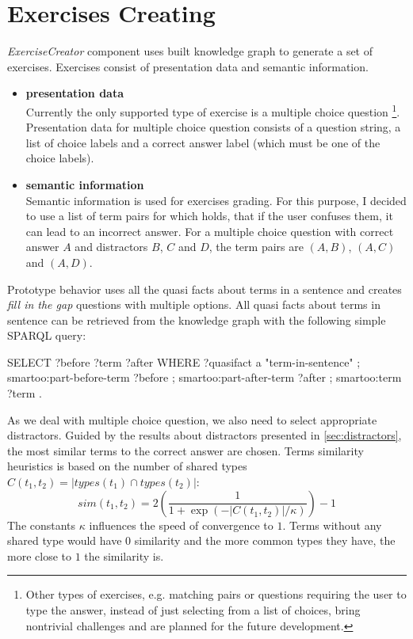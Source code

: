 \documentclass[12pt, twoside]{fithesis2}
\renewcommand{\_}{\leavevmode \kern0.07em\vbox{\hrule width0.4em}}
\newcommand{\squarebullet}{\textcolor{black}{\raisebox{0.15em}{\rule{4pt}{4pt}}}}
\newcommand{\emptysquarebullet}{\textcolor{black}{\raisebox{0.10em}{\tiny$\square$}}}
\newenvironment{myItemize}{
  \begin{itemize}[leftmargin=2em,rightmargin=1em,itemsep=\parskip ,parsep=0em,topsep=0em,partopsep=0em]
  \renewcommand{\labelitemi}{\squarebullet}
  \renewcommand{\labelitemii}{\textbullet}
}{
  \end{itemize}
}
\newcounter{choice}
\begin{document}
\section{Exercises Creating}
\label{sec:smartoo-exercises}

\textit{ExerciseCreator} component uses built knowledge graph to generate a set of exercises.
Exercises consist of presentation data and semantic information.
\begin{myItemize}
  \item \textbf{presentation data}\\
    Currently the only supported type of exercise is a multiple choice question%
    \footnote{Other types of exercises, e.g. matching pairs or questions requiring the user to type the answer, instead of just selecting from a list of choices,
    bring nontrivial challenges and are planned for the future development.}.
    Presentation data for multiple choice question consists of a question string, a list of choice labels and a correct answer label (which must be one of the choice labels).
  \item \textbf{semantic information}\\
    Semantic information is used for exercises grading. For this purpose, I decided to use a list of term pairs for which holds, that if the user confuses them, it can lead to an incorrect answer.
    For a multiple choice question with correct answer $A$ and distractors $B$, $C$ and $D$,
    the term pairs are $(A, B)$, $(A, C)$ and $(A, D)$.
\end{myItemize}


Prototype behavior uses all the quasi facts about terms in a sentence and creates \emph{fill in the gap} questions with multiple options.
All quasi facts about terms in sentence can be retrieved from the knowledge graph with the following simple SPARQL query:
\begin{code}
SELECT ?before ?term ?after
WHERE {
    ?quasifact a "term-in-sentence" ;
        smartoo:part-before-term ?before ;
        smartoo:part-after-term ?after ;
        smartoo:term ?term .
}
\end{code}

As we deal with multiple choice question, we also need to select appropriate distractors.
Guided by the results about distractors presented in \autoref{sec:distractors},
the most similar terms to the correct answer are chosen.
Terms similarity heuristics is based on the number of shared types
$C(t_1, t_2) = |types(t_1) \cap types(t_2)|$:
\begin{equation}\label{eq:terms-similarity}
sim(t_1, t_2) = 2 \left( \frac{1}{1 + \exp({-|C(t_1, t_2)| / \kappa})} \right) - 1
\end{equation}
The constants $\kappa$ influences the speed of convergence to $1$.
Terms without any shared type would have $0$ similarity and the more common types they have, the more close to $1$ the similarity is.
\end{document}
